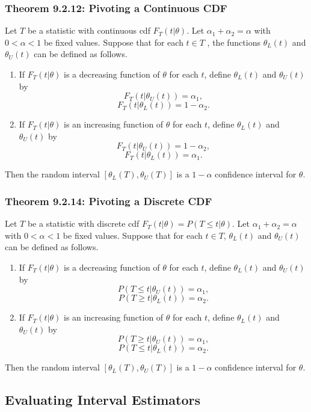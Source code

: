 		\subsubsection{Theorem 9.2.12: Pivoting a Continuous CDF}
			Let $T$ be a statistic with continuous cdf $F_T(t|\theta)$. Let $\alpha_1 + \alpha_2 = \alpha$ with $0 < \alpha < 1$ be fixed values. Suppose that for each $t\in T$ , the functions $\theta_L(t)$ and $\theta_U(t)$ can be defined as follows.
			\begin{enumerate}
				\item If $F_T(t|\theta)$ is a decreasing function of $\theta$ for each $t$, define $\theta_L(t)$ and $\theta_U(t)$ by $$F_T(t|\theta_U(t)) = \alpha_1,$$ $$F_T(t|\theta_L(t)) =1-\alpha_2.$$
				\item If $F_T(t|\theta)$ is an increasing function of $\theta$ for each $t$, define $\theta_L(t)$ and $\theta_U(t)$ by
			$$F_T(t|\theta_U(t)) =1 -\alpha_2,$$ $$F_T(t|\theta_L(t)) = \alpha_1.$$
			\end{enumerate}
			Then the random interval $[\theta_L(T), \theta_U(T)]$ is a $1 -\alpha$ confidence interval for $\theta$.
			
		\subsubsection{Theorem 9.2.14: Pivoting a Discrete CDF}
			Let $T$ be a statistic with discrete cdf $F_T(t|\theta)=P(T\leq t|\theta)$. Let $\alpha_1 + \alpha_2 = \alpha$ with $0 < \alpha < 1$ be fixed values. Suppose that for each $t\in T$, $\theta_L(t)$ and $\theta_U(t)$ can be defined as follows.
			\begin{enumerate}
				\item If $F_T(t|\theta)$ is a decreasing function of $\theta$ for each $t$, define $\theta_L(t)$ and $\theta_U(t)$ by $$P(T\leq t|\theta_U(t)) = \alpha_1,$$ $$P(T\geq t|\theta_L(t)) =\alpha_2.$$
				\item If $F_T(t|\theta)$ is an increasing function of $\theta$ for each $t$, define $\theta_L(t)$ and $\theta_U(t)$ by
				$$P(T\geq t|\theta_U(t))=\alpha_1,$$ $$P(T\leq t|\theta_L(t))=\alpha_2.$$				
			\end{enumerate}
			Then the random interval $[\theta_L(T), \theta_U(T)]$ is a $1-\alpha$ confidence interval for $\theta$.
			
			
	\subsection{Evaluating Interval Estimators}
